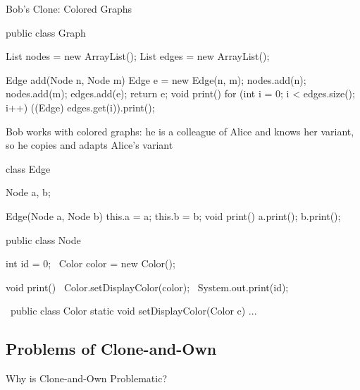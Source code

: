 \begin{frame}[fragile]{Bob's Clone: Colored Graphs}
	\begin{fancycolumns}[b,columns=3,widths={43,26},animation=none]
\begin{codetight}{}
public class Graph {
	List nodes = new ArrayList();
	List edges = new ArrayList();

	Edge add(Node n, Node m) {
		Edge e = new Edge(n, m);
		nodes.add(n); nodes.add(m); edges.add(e);
		return e;
	}
	void print() {
		for (int i = 0; i < edges.size(); i++) {
			((Edge) edges.get(i)).print();
		}
	}
}
\end{codetight}
	\nextcolumn
		\begin{example}{}
			Bob works with colored graphs: he is a colleague of Alice and knows her variant, so he copies and adapts Alice's variant
		\end{example}
\begin{codetight}{}
class Edge {
	Node a, b;

	Edge(Node a, Node b) {
		this.a = a; this.b = b;
	}
	void print() {
		a.print(); b.print();
	}
}
\end{codetight}
	\nextcolumn
\begin{codetight}{}
public class Node {
	int id = 0;
	~Color color = new Color();~

	void print() {
		~Color.setDisplayColor(color);~
		System.out.print(id);
	}
}
\end{codetight}
\begin{codetight}{}
~public class Color {
	static void setDisplayColor(Color c) {...}
}~
\end{codetight}
	\end{fancycolumns}
\end{frame}

\subsection{Problems of Clone-and-Own}

\begin{frame}{Why is Clone-and-Own Problematic?}
	~\hfill
	\hfill
	\hfill
	\hfill~
\end{frame}

